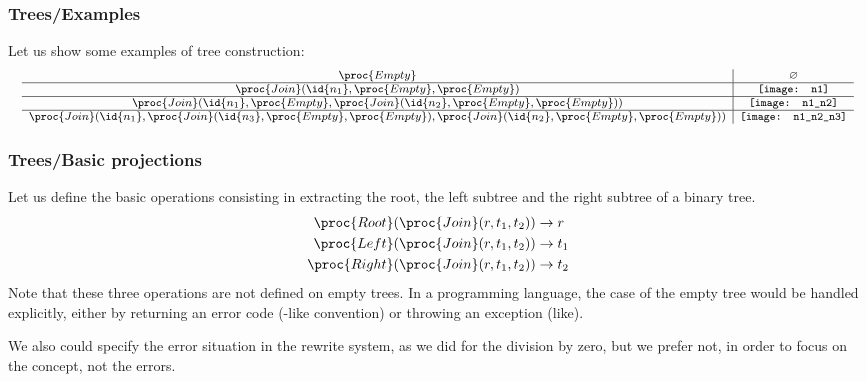%
\begin{frame}
\frametitle{Trees/Examples}

Let us show some examples of tree construction:
\[\footnotesize
\begin{array}{c|c}
  \proc{Empty} 
& \varnothing\\
\hline
  \proc{Join} (\id{n_1}, \proc{Empty}, \proc{Empty})
& \texttt{[image: n1]}\\%
\hline
  \proc{Join} (\id{n_1}, \proc{Empty}, \proc{Join} (\id{n_2},
  \proc{Empty}, \proc{Empty}))
& \texttt{[image: n1\_n2]}\\%
\hline
  \proc{Join} (\id{n_1}, \proc{Join} (\id{n_3},
  \proc{Empty}, \proc{Empty}), \proc{Join} (\id{n_2},
  \proc{Empty}, \proc{Empty}))
& \texttt{[image: n1\_n2\_n3]}
\end{array}
\]

\end{frame}

%
\begin{frame}
\frametitle{Trees/Basic projections}

Let us define the basic operations consisting in extracting the root,
the left subtree and the right subtree of a binary tree.
\begin{align*}
  \proc{Root} (\proc{Join} (r, t_1, t_2)) 
& \rightarrow r\\
  \proc{Left} (\proc{Join} (r, t_1, t_2))
& \rightarrow t_1\\
  \proc{Right} (\proc{Join} (r, t_1, t_2))
& \rightarrow t_2
\end{align*}
Note that these three operations are not defined on empty trees. In a
programming language, the case of the empty tree would be handled
explicitly, either by returning an error code (\C-like convention) or
throwing an exception (\Cpp like).

\bigskip

We also could specify the error situation in the rewrite system, as we
did for the division by zero, but we prefer not, in order to focus on
the concept, not the errors.

\end{frame}

